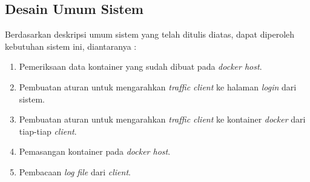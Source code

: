     \subsection{Desain Umum Sistem}
      \indent Berdasarkan deskripsi umum sistem yang telah ditulis diatas, dapat diperoleh kebutuhan sistem ini, diantaranya :
        \begin{enumerate}
        \item Pemeriksaan data kontainer yang sudah dibuat pada \textit{docker host}.
        \item Pembuatan aturan untuk mengarahkan \textit{traffic client} ke halaman \textit{login} dari sistem.
        \item Pembuatan aturan untuk mengarahkan \textit{traffic client} ke kontainer \textit{docker} dari tiap-tiap \textit{client}.
        \item Pemasangan kontainer pada \textit{docker host}.
        \item Pembacaan \textit{log file} dari \textit{client}.
        \end{enumerate} 
      

